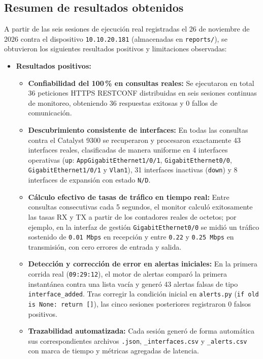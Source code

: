 \documentclass[12pt,a4paper]{article}
\begin{document}
\subsection{Resumen de resultados obtenidos}

A partir de las seis sesiones de ejecución real registradas el 26 de noviembre de 2026 contra el dispositivo \texttt{10.10.20.181} (almacenadas en \texttt{reports/}), se obtuvieron los siguientes resultados positivos y limitaciones observadas:

\begin{itemize}
    \item \textbf{Resultados positivos:}
    \begin{itemize}
        \item \textbf{Confiabilidad del 100\,\% en consultas reales:} Se ejecutaron en total 36 peticiones HTTPS RESTCONF distribuidas en seis sesiones continuas de monitoreo, obteniendo 36 respuestas exitosas y 0 fallos de comunicación.
        \item \textbf{Descubrimiento consistente de interfaces:} En todas las consultas contra el Catalyst 9300 se recuperaron y procesaron exactamente 43 interfaces reales, clasificadas de manera uniforme en 4 interfaces operativas (\texttt{up}: \texttt{AppGigabitEthernet1/0/1}, \texttt{GigabitEthernet0/0}, \texttt{GigabitEthernet1/0/1} y \texttt{Vlan1}), 31 interfaces inactivas (\texttt{down}) y 8 interfaces de expansión con estado \texttt{N/D}.
        \item \textbf{Cálculo efectivo de tasas de tráfico en tiempo real:} Entre consultas consecutivas cada 5 segundos, el monitor calculó exitosamente las tasas RX y TX a partir de los contadores reales de octetos; por ejemplo, en la interfaz de gestión \texttt{GigabitEthernet0/0} se midió un tráfico sostenido de \texttt{0.01 Mbps} en recepción y entre \texttt{0.22} y \texttt{0.25 Mbps} en transmisión, con cero errores de entrada y salida.
        \item \textbf{Detección y corrección de error en alertas iniciales:} En la primera corrida real (\texttt{09:29:12}), el motor de alertas comparó la primera instantánea contra una lista vacía y generó 43 alertas falsas de tipo \texttt{interface\_added}. Tras corregir la condición inicial en \texttt{alerts.py} (\texttt{if old is None: return []}), las cinco sesiones posteriores registraron 0 falsos positivos.
        \item \textbf{Trazabilidad automatizada:} Cada sesión generó de forma automática sus correspondientes archivos \texttt{.json}, \texttt{\_interfaces.csv} y \texttt{\_alerts.csv} con marca de tiempo y métricas agregadas de latencia.

\end{itemize}
\end{itemize}
\end{document}
